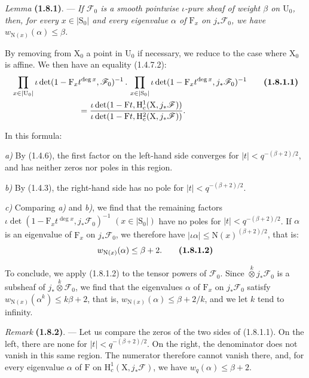 \documentclass[11pt,leqno]{article}
\begin{document}
\textit{Lemma} \textbf{(1.8.1)}. — \textit{If \(\mathscr{F}_0\) is a smooth pointwise \(\iota\)-pure sheaf of weight \(\beta\) on \(\mathrm{U}_0\), then, for every \(x\in|\mathrm{S}_0|\) and every eigenvalue \(\alpha\) of \(\mathrm{F}_x\) on \(j_*\mathscr{F}_0\), we have \(w_{\mathrm{N}(x)}(\alpha)\leq\beta\).}

By removing from \(\mathrm{X}_0\) a point in \(\mathrm{U}_0\) if necessary, we reduce to the case where \(\mathrm{X}_0\) is affine. We then have an equality (1.4.7.2):
\begin{align*}
&\prod_{x\in|\mathrm{U}_0|}
  \iota\det(1-\mathrm{F}_x t^{\deg x},\mathscr{F}_0)^{-1}
  \,.\,
  \prod_{x\in|\mathrm{S}_0|}
  \iota\det(1-\mathrm{F}_x t^{\deg x},j_*\mathscr{F}_0)^{-1}
  \tag*{\textbf{(1.8.1.1)}}\\
&\hspace{8em}=
  \frac{\iota\det(1-\mathrm{F}t,\mathrm{H}_c^1(\mathrm{X},j_*\mathscr{F}))}
       {\iota\det(1-\mathrm{F}t,\mathrm{H}_c^2(\mathrm{X},j_*\mathscr{F}))}.
\end{align*}

In this formula:

\textit{a)} By (1.4.6), the first factor on the left-hand side converges for \(|t|<q^{-(\beta+2)/2}\), and has neither zeros nor poles in this region.

\textit{b)} By (1.4.3), the right-hand side has no pole for \(|t|<q^{-(\beta+2)/2}\).

\textit{c)} Comparing \textit{a)} and \textit{b)}, we find that the remaining factors \(\iota\det(1-\mathrm{F}_x t^{\deg x},j_*\mathscr{F}_0)^{-1}\) \((x\in|\mathrm{S}_0|)\) have no poles for \(|t|<q^{-(\beta+2)/2}\). If \(\alpha\) is an eigenvalue of \(\mathrm{F}_x\) on \(j_*\mathscr{F}_0\), we therefore have \(|\iota\alpha|\leq\mathrm{N}(x)^{(\beta+2)/2}\), that is:
\[
w_{\mathrm{N}(x)}(\alpha)\leq\beta+2.
\tag*{\textbf{(1.8.1.2)}}
\]

To conclude, we apply (1.8.1.2) to the tensor powers of \(\mathscr{F}_0\). Since \(\mathop{\otimes}\limits^k j_*\mathscr{F}_0\) is a subsheaf of \(j_*\mathop{\otimes}\limits^k\mathscr{F}_0\), we find that the eigenvalues \(\alpha\) of \(\mathrm{F}_x\) on \(j_*\mathscr{F}_0\) satisfy \(w_{\mathrm{N}(x)}(\alpha^k)\leq k\beta+2\), that is, \(w_{\mathrm{N}(x)}(\alpha)\leq\beta+2/k\), and we let \(k\) tend to infinity.

\textit{Remark} \textbf{(1.8.2)}. — Let us compare the zeros of the two sides of (1.8.1.1). On the left, there are none for \(|t|<q^{-(\beta+2)/2}\). On the right, the denominator does not vanish in this same region. The numerator therefore cannot vanish there, and, for every eigenvalue \(\alpha\) of \(\mathrm{F}\) on \(\mathrm{H}_c^1(\mathrm{X},j_*\mathscr{F})\), we have \(w_q(\alpha)\leq\beta+2\).
\end{document}
